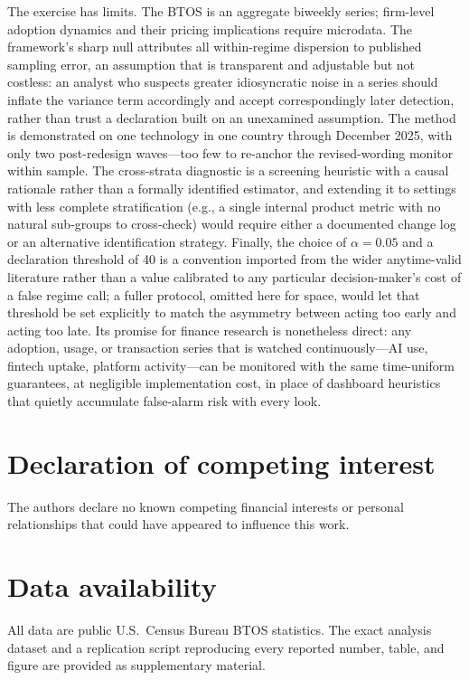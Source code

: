 \documentclass[preprint,12pt]{elsarticle}
\begin{document}
The exercise has limits. The BTOS is an aggregate biweekly series; firm-level adoption dynamics and their pricing implications require microdata. The framework's sharp null attributes all within-regime dispersion to published sampling error, an assumption that is transparent and adjustable but not costless: an analyst who suspects greater idiosyncratic noise in a series should inflate the variance term accordingly and accept correspondingly later detection, rather than trust a declaration built on an unexamined assumption. The method is demonstrated on one technology in one country through December 2025, with only two post-redesign waves---too few to re-anchor the revised-wording monitor within sample. The cross-strata diagnostic is a screening heuristic with a causal rationale rather than a formally identified estimator, and extending it to settings with less complete stratification (e.g., a single internal product metric with no natural sub-groups to cross-check) would require either a documented change log or an alternative identification strategy. Finally, the choice of $\alpha=0.05$ and a declaration threshold of 40 is a convention imported from the wider anytime-valid literature rather than a value calibrated to any particular decision-maker's cost of a false regime call; a fuller protocol, omitted here for space, would let that threshold be set explicitly to match the asymmetry between acting too early and acting too late. Its promise for finance research is nonetheless direct: any adoption, usage, or transaction series that is watched continuously---AI use, fintech uptake, platform activity---can be monitored with the same time-uniform guarantees, at negligible implementation cost, in place of dashboard heuristics that quietly accumulate false-alarm risk with every look.

\section*{Declaration of competing interest}
The authors declare no known competing financial interests or personal relationships that could have appeared to influence this work.

\section*{Data availability}
All data are public U.S.\ Census Bureau BTOS statistics. The exact analysis dataset and a replication script reproducing every reported number, table, and figure are provided as supplementary material.
\end{document}
